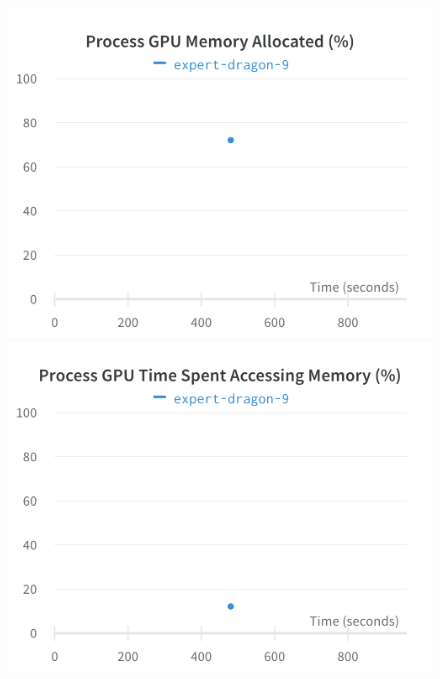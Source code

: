 \documentclass{article}
\begin{document}
\begin{figure}[!htb]
\includegraphics[width=\linewidth]{charts/Section-6-Panel-0-mkko41ovm}
\caption{}
\endminipage\hfill
{}
\includegraphics[width=\linewidth]{charts/Section-6-Panel-1-ihgfh1ua5}
\caption{}
\endminipage
\end{figure}
\end{document}
